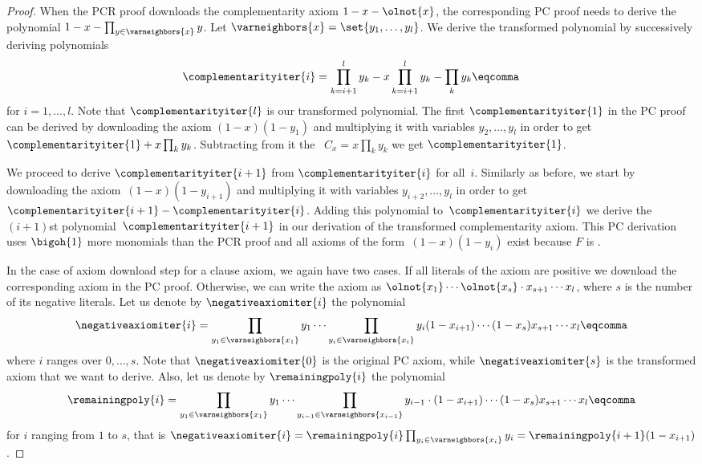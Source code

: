 \documentclass{toc}
\begin{document}
\begin{proof}
  When the PCR proof downloads the complementarity axiom $1 - x -
  \olnot{x}$, the corresponding PC proof needs to derive the
  polynomial $1 - x - \prod_{y \in \varneighbors{x}} y$. Let
  $\varneighbors{x} = \set{y_1, \ldots, y_l}$. We derive the
  transformed polynomial by successively deriving polynomials
  \begin{equation}
    \complementarityiter{i} = \prod_{k = i + 1}^l y_k - x \prod_{k = i + 1}^l y_k - \prod_k y_k \eqcomma
  \end{equation}
  for $i = 1, \ldots, l$. Note that $\complementarityiter{l}$ is our
  transformed polynomial. The first $\complementarityiter{1}$ in the
  PC proof can be derived by downloading the axiom $(1 - x)(1 - y_1)$
  and multiplying it with variables $y_2, \ldots, y_l$ in order to get
  $\complementarityiter{1} + x \prod_k y_k$. Subtracting from it
  the~ $C_x = x \prod_k y_k$ we get
  $\complementarityiter{1}$.


  We proceed to derive $\complementarityiter{i + 1}$ from
  $\complementarityiter{i}$ for all~$i$. Similarly as before, we start
  by downloading the axiom~$(1 - x)(1 - y_{i + 1})$ and multiplying it
  with variables $y_{i + 2}, \ldots, y_l$ in order to get
  $\complementarityiter{i + 1} - \complementarityiter{i}$. Adding this
  polynomial to~$\complementarityiter{i}$ we derive the $(i + 1)$st
  polynomial~$\complementarityiter{i + 1}$ in our derivation of the
  transformed complementarity axiom. This PC derivation uses
  $\bigoh{1}$ more monomials than the PCR proof and all axioms of the
  form~$(1 - x)(1 - y_i)$ exist because $F$ is
  \varweightconstrained{}.

  In the case of axiom download step for a clause axiom, we again have
  two cases. If all literals of the axiom are positive we download the
  corresponding axiom in the PC proof. Otherwise, we can write the
  axiom as $\olnot{x_1} \cdots \olnot{x_s} \cdot x_{s + 1} \cdots
  x_l$, where $s$ is the number of its negative literals.
  Let us denote by $\negativeaxiomiter{i}$
  the polynomial
  \begin{equation}
    \negativeaxiomiter{i} = \prod_{y_1 \in \varneighbors{x_1}} y_1 \cdots \prod_{y_i \in
      \varneighbors{x_i}} y_i (1 - x_{i + 1}) \cdots (1 - x_s) x_{s + 1} \cdots x_l \eqcomma
  \end{equation}
  where $i$ ranges over $0, \ldots, s$. Note that
  $\negativeaxiomiter{0}$ is the original PC axiom, while
  $\negativeaxiomiter{s}$ is the transformed axiom that we want to
  derive. Also, let us denote by $\remainingpoly{i}$ the polynomial
  \begin{equation}
    \remainingpoly{i} = \prod_{y_1 \in \varneighbors{x_1}} y_1 \cdots \prod_{y_{i - 1} \in \varneighbors{x_{i - 1}}} y_{i - 1} \cdot (1 - x_{i + 1}) \cdots (1 - x_s) x_{s + 1} \cdots x_l \eqcomma
  \end{equation}
  for $i$ ranging from $1$ to $s$, that is $\negativeaxiomiter{i} =
  \remainingpoly{i} \prod_{y_i \in \varneighbors{x_i}} y_i =
  \remainingpoly{i + 1} (1 - x_{i + 1})$.


\end{proof}
\end{document}
